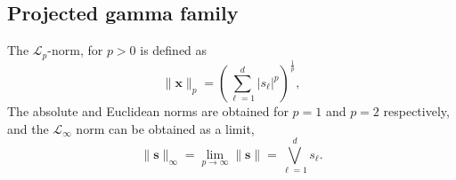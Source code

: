 \subsection{Projected gamma family\label{subsec:projgamma}}
The $\mathcal{L}_p$-norm, for $p>0$ is  defined as
  \begin{equation*}
    \lVert \bm{x} \rVert_p = 
    \left({\textstyle\sum}_{\ell = 1}^d \lvert s_{\ell}\rvert^p\right)^{\frac{1}{p}},
  \end{equation*}
The absolute and Euclidean norms are obtained for $p=1$ and $p=2$ respectively,
  and the $\mathcal{L}_{\infty}$ norm can be obtained as a limit, 
  \begin{equation*}
    \| \bm{s} \|_{\infty}
      = \lim\limits_{p\to\infty} \| \bm{s} \|
      = \underset{\ell = 1}{\overset{d}{\bigvee}}s_{\ell}.
  \end{equation*}
  
